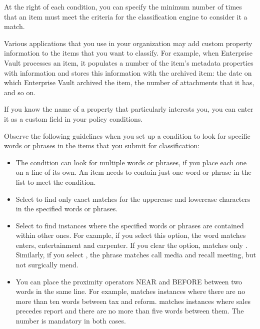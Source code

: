 \documentclass[letterpaper,10pt,english]{sphinxmanual}
\begin{document}
At the right of each condition, you can specify the minimum number of times that
an item must meet the criteria for the classification engine to consider it a
match.


Various applications that you use in your organization may add custom property
information to the items that you want to classify. For example, when Enterprise
Vault processes an item, it populates a number of the item’s metadata properties
with information and stores this information with the archived item: the date on
which Enterprise Vault archived the item, the number of attachments that it has,
and so on.

If you know the name of a property that particularly interests you, you can enter it
as a custom field in your policy conditions.

\begin{figure}[htbp]
\centering

\noindent{}
\end{figure}


Observe the following guidelines when you set up a condition to look for specific
words or phrases in the items that you submit for classification:
\begin{itemize}
\item {} 
The condition can look for multiple words or phrases, if you place each one on a line of its own. An item needs to contain just one word or phrase in the list to meet the condition.

\item {} 
Select  to find only exact matches for the uppercase and lowercase characters in the specified words or phrases.

\item {} 
Select  to find instances where the specified words or phrases are contained within other ones. For example, if you select this option, the word  matches enters, entertainment and carpenter. If you clear the option,  matches only . Similarly, if you select , the phrase  matches call media and recall meeting, but not surgically mend.

\item {} 
You can place the proximity operators NEAR and BEFORE between two words in the same line. For example,  matches instances where there are no more than ten words between tax and reform.  matches instances where sales precedes report and there are no more than five words between them. The number is mandatory in both cases.

\end{itemize}
\end{document}
